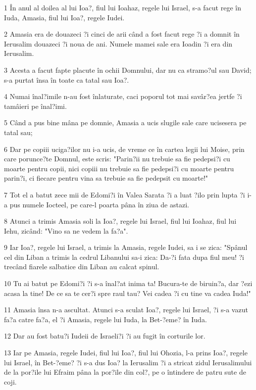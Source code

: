 \par 1 În anul al doilea al lui Ioa?, fiul lui Ioahaz, regele lui Israel, s-a facut rege în Iuda, Amasia, fiul lui Ioa?, regele Iudei.
\par 2 Amasia era de douazeci ?i cinci de arii când a fost facut rege ?i a domnit în Ierusalim douazeci ?i noua de ani. Numele mamei sale era Ioadin ?i era din Ierusalim.
\par 3 Acesta a facut fapte placute în ochii Domnului, dar nu ca stramo?ul sau David; s-a purtat însa în toate ca tatal sau Ioa?.
\par 4 Numai înal?imile n-au fost înlaturate, caci poporul tot mai savâr?ea jertfe ?i tamâieri pe înal?imi.
\par 5 Când a pus bine mâna pe domnie, Amasia a ucis slugile sale care ucisesera pe tatal sau;
\par 6 Dar pe copiii uciga?ilor nu i-a ucis, de vreme ce în cartea legii lui Moise, prin care porunce?te Domnul, este scris: "Parin?ii nu trebuie sa fie pedepsi?i cu moarte pentru copii, nici copiii nu trebuie sa fie pedepsi?i cu moarte pentru parin?i, ci fiecare pentru vina sa trebuie sa fie pedepsit cu moarte!"
\par 7 Tot el a batut zece mii de Edomi?i în Valea Sarata ?i a luat ?ilo prin lupta ?i i-a pus numele Iocteel, pe care-l poarta pâna în ziua de astazi.
\par 8 Atunci a trimis Amasia soli la Ioa?, regele lui Israel, fiul lui Ioahaz, fiul lui Iehu, zicând: "Vino sa ne vedem la fa?a".
\par 9 Iar Ioa?, regele lui Israel, a trimis la Amasia, regele Iudei, sa i se zica: "Spânul cel din Liban a trimis la cedrul Libanului sa-i zica: Da-?i fata dupa fiul meu! ?i trecând fiarele salbatice din Liban au calcat spinul.
\par 10 Tu ai batut pe Edomi?i ?i s-a înal?at inima ta! Bucura-te de biruin?a, dar ?ezi acasa la tine! De ce sa te cer?i spre raul tau? Vei cadea ?i cu tine va cadea Iuda!"
\par 11 Amasia însa n-a ascultat. Atunci s-a sculat Ioa?, regele lui Israel, ?i s-a vazut fa?a catre fa?a, el ?i Amasia, regele lui Iuda, la Bet-?eme? în Iuda.
\par 12 Dar au fost batu?i Iudeii de Israeli?i ?i au fugit în corturile lor.
\par 13 Iar pe Amasia, regele Iudei, fiul lui Ioa?, fiul lui Ohozia, l-a prins Ioa?, regele lui Israel, în Bet-?eme? ?i s-a dus Ioa? la Ierusalim ?i a stricat zidul Ierusalimului de la por?ile lui Efraim pâna la por?ile din col?, pe o întindere de patru sute de coji.
